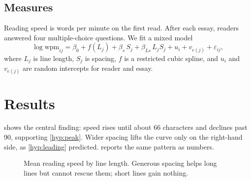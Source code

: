 \documentclass[11pt]{article}
\begin{document}
\subsection{Measures}
Reading speed is words per minute on the first read. After each essay,
readers answered four multiple-choice questions. We fit a mixed model
\begin{equation}
  \label{eq:model}
  \log \mathrm{wpm}_{ij} = \beta_0 + f(L_j) + \beta_s\, S_j + \beta_{Ls}\, L_j S_j
    + u_i + v_{e(j)} + \varepsilon_{ij},
\end{equation}
where $L_j$ is line length, $S_j$ is spacing, $f$ is a restricted cubic spline,
and $u_i$ and $v_{e(j)}$ are random intercepts for reader and essay.

\section{Results}

 shows the central finding: speed rises until about 66
characters and declines past 90, supporting \cref{hyp:peak}. Wider spacing lifts
the curve only on the right-hand side, as \cref{hyp:leading} predicted.
 reports the same pattern as numbers.

\begin{figure}[t]
  \centering
  \caption{Mean reading speed by line length. Generous spacing helps long lines
    but cannot rescue them; short lines gain nothing.}
  \label{fig:speed}
\end{figure}
\end{document}
